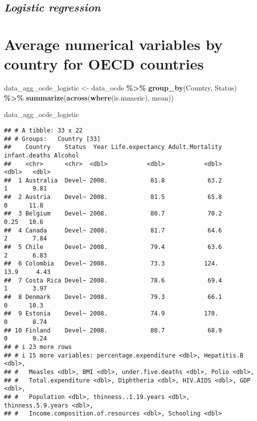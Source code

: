 \documentclass[
]{article}
\newenvironment{Shaded}{\begin{snugshade}}{\end{snugshade}}
\newcommand{\FunctionTok}[1]{\textcolor[rgb]{0.13,0.29,0.53}{\textbf{#1}}}
\newcommand{\NormalTok}[1]{#1}
\newcommand{\OtherTok}[1]{\textcolor[rgb]{0.56,0.35,0.01}{#1}}
\newcommand{\SpecialCharTok}[1]{\textcolor[rgb]{0.81,0.36,0.00}{\textbf{#1}}}
\begin{document}
\subsection{\texorpdfstring{\emph{Logistic
regression}}{Logistic regression}}\label{logistic-regression}

\section{Average numerical variables by country for OECD
countries}\label{average-numerical-variables-by-country-for-oecd-countries}

\begin{Shaded}
\begin{Highlighting}[]
\NormalTok{data\_agg\_ocde\_logistic }\OtherTok{\textless{}{-}}\NormalTok{ data\_ocde }\SpecialCharTok{\%\textgreater{}\%}
  \FunctionTok{group\_by}\NormalTok{(Country, Status) }\SpecialCharTok{\%\textgreater{}\%}
  \FunctionTok{summarize}\NormalTok{(}\FunctionTok{across}\NormalTok{(}\FunctionTok{where}\NormalTok{(is.numeric), mean))}

\NormalTok{data\_agg\_ocde\_logistic}
\end{Highlighting}
\end{Shaded}

\begin{verbatim}
## # A tibble: 33 x 22
## # Groups:   Country [33]
##    Country    Status  Year Life.expectancy Adult.Mortality infant.deaths Alcohol
##    <chr>      <chr>  <dbl>           <dbl>           <dbl>         <dbl>   <dbl>
##  1 Australia  Devel~ 2008.            81.8            63.2          1       9.81
##  2 Austria    Devel~ 2008.            81.5            65.8          0      11.8 
##  3 Belgium    Devel~ 2008.            80.7            70.2          0.25   10.6 
##  4 Canada     Devel~ 2008.            81.7            64.6          2       7.84
##  5 Chile      Devel~ 2008.            79.4            63.6          2       6.83
##  6 Colombia   Devel~ 2008.            73.3           124.          13.9     4.43
##  7 Costa Rica Devel~ 2008.            78.6            69.4          1       3.97
##  8 Denmark    Devel~ 2008.            79.3            66.1          0      10.3 
##  9 Estonia    Devel~ 2008.            74.9           170.           0       8.74
## 10 Finland    Devel~ 2008.            80.7            68.9          0       9.24
## # i 23 more rows
## # i 15 more variables: percentage.expenditure <dbl>, Hepatitis.B <dbl>,
## #   Measles <dbl>, BMI <dbl>, under.five.deaths <dbl>, Polio <dbl>,
## #   Total.expenditure <dbl>, Diphtheria <dbl>, HIV.AIDS <dbl>, GDP <dbl>,
## #   Population <dbl>, thinness..1.19.years <dbl>, thinness.5.9.years <dbl>,
## #   Income.composition.of.resources <dbl>, Schooling <dbl>
\end{verbatim}
\end{document}

